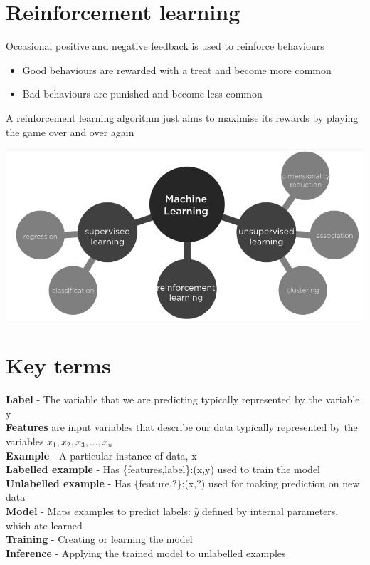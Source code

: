 \documentclass{article}[18pt]
\begin{document}
\section{Reinforcement learning}
Occasional positive and negative feedback is used to reinforce behaviours
\begin{itemize}
	\item Good behaviours are rewarded with a treat and become more common
	\item Bad behaviours are punished and become less common
\end{itemize}
A reinforcement learning algorithm just aims to maximise its rewards by playing the game over and over again
\begin{center}
	\includegraphics[scale=0.7]{Categories}
\end{center}
\section{Key terms}
\textbf{Label} - The variable that we are predicting typically represented by the variable y\\
\textbf{Features} are input variables that describe our data typically represented by the variables ${x_1,x_2,x_3,...,x_n}$\\
\textbf{Example} - A particular instance of data, x\\
\textbf{Labelled example} - Has \{features,label\}:(x,y) used to train the model\\
\textbf{Unlabelled example} - Has \{feature,?\}:(x,?) used for making prediction on new data\\
\textbf{Model} - Maps examples to predict labels: $\hat{y}$ defined by internal parameters, which ate learned\\
\textbf{Training} - Creating or learning the model\\
\textbf{Inference} - Applying the trained model to unlabelled examples
\end{document}
